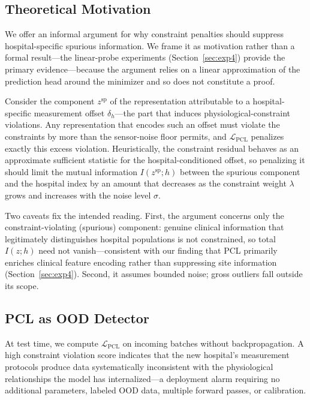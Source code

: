\documentclass{article}
\begin{document}
\subsection{Theoretical Motivation}
\label{sec:theory}

We offer an informal argument for why constraint penalties should suppress hospital-specific spurious information. We frame it as motivation rather than a formal result---the linear-probe experiments (Section~\ref{sec:exp4}) provide the primary evidence---because the argument relies on a linear approximation of the prediction head around the minimizer and so does not constitute a proof.

Consider the component $z^{\mathrm{sp}}$ of the representation attributable to a hospital-specific measurement offset $\delta_h$---the part that induces physiological-constraint violations. Any representation that encodes such an offset must violate the constraints by more than the sensor-noise floor permits, and $\mathcal{L}_{\text{PCL}}$ penalizes exactly this excess violation. Heuristically, the constraint residual behaves as an approximate sufficient statistic for the hospital-conditioned offset, so penalizing it should limit the mutual information $I(z^{\mathrm{sp}}; h)$ between the spurious component and the hospital index by an amount that decreases as the constraint weight $\lambda$ grows and increases with the noise level $\sigma$.

Two caveats fix the intended reading. First, the argument concerns only the constraint-violating (spurious) component: genuine clinical information that legitimately distinguishes hospital populations is not constrained, so total $I(z; h)$ need not vanish---consistent with our finding that PCL primarily enriches clinical feature encoding rather than suppressing site information (Section~\ref{sec:exp4}). Second, it assumes bounded noise; gross outliers fall outside its scope.

\subsection{PCL as OOD Detector}
\label{sec:ood_detector}

At test time, we compute $\mathcal{L}_{\text{PCL}}$ on incoming batches without backpropagation.
A high constraint violation score indicates that the new hospital's measurement protocols produce data systematically inconsistent with the physiological relationships the model has internalized---a deployment alarm requiring no additional parameters, labeled OOD data, multiple forward passes, or calibration.
\end{document}
